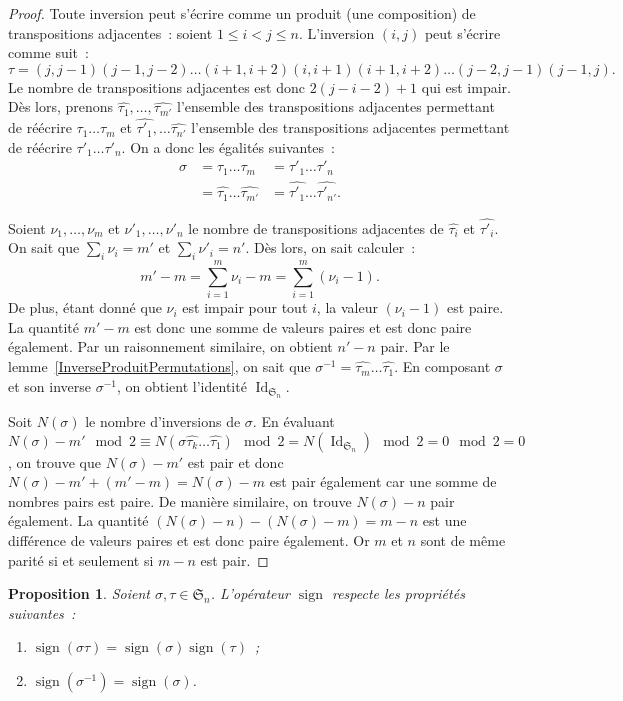 \documentclass{article}
\DeclareMathOperator{\Id}{Id}
\DeclareMathOperator{\sign}{sign}
\newcommand{\Perm}{\mathfrak{S}}
\newtheorem{prp}[thm]{Proposition}
\theoremstyle{definition}
\theoremstyle{remark}
\begin{document}
		\begin{proof} Toute inversion peut s'écrire comme un produit (une composition) de transpositions adjacentes~: soient $1 \leq i < j \leq n$. L'inversion $(i, j)$
		peut s'écrire comme suit~: \[\tau = (j, j-1)(j-1, j-2)\ldots(i+1, i+2)(i, i+1)(i+1, i+2)\ldots(j-2, j-1)(j-1, j).\]
		Le nombre de transpositions adjacentes est donc $2(j-i-2) + 1$ qui est impair. Dès lors, prenons $\hat{\tau_1}, \ldots, \hat{\tau_{m'}}$ l'ensemble des transpositions
		adjacentes permettant de réécrire $\tau_1\ldots\tau_m$ et $\hat{\tau'_1}, \ldots \hat{\tau_{n'}}$ l'ensemble des transpositions adjacentes permettant de réécrire
		$\tau'_1\ldots\tau'_n$. On a donc les égalités suivantes~:
		\[\begin{aligned}
			\sigma &= \tau_1\ldots\tau_m &= \tau'_1\ldots\tau'_n \\
			       &= \hat{\tau_1}\ldots\hat{\tau_{m'}} &= \hat{\tau'_1}\ldots\hat{\tau'_{n'}}.
		\end{aligned}\]

		Soient $\nu_1, \ldots, \nu_m$ et $\nu'_1, \ldots, \nu'_n$ le nombre de transpositions adjacentes de $\hat{\tau_i}$ et $\hat{\tau'_i}$. On sait que $\sum_i\nu_i = m'$
		et $\sum_i\nu'_i = n'$. Dès lors, on sait calculer~:
		\[m'-m = \sum_{i=1}^m\nu_i - m = \sum_{i=1}^m(\nu_i-1).\]
		De plus, étant donné que $\nu_i$ est impair pour tout $i$, la valeur $(\nu_i-1)$ est paire. La quantité $m'-m$ est donc une somme de valeurs paires et est donc paire également.
		Par un raisonnement similaire, on obtient $n'-n$ pair. Par le lemme~\ref{InverseProduitPermutations}, on sait que $\sigma^{-1} = \hat{\tau_m}\ldots\hat{\tau_1}$. En composant
		$\sigma$ et son inverse $\sigma^{-1}$, on obtient l'identité $\Id_{\Perm_n}$.

		Soit $N(\sigma)$ le nombre d'inversions de $\sigma$. En évaluant $N(\sigma) - m' \mod 2 \equiv N(\sigma\hat{\tau_k}\ldots\hat{\tau_1}) \mod 2 = N(\Id_{\Perm_n}) \mod 2 = 0 \mod 2 = 0$,
		on trouve que $N(\sigma) - m'$ est pair et donc $N(\sigma) - m' + (m' - m) = N(\sigma) - m$ est pair également car une somme de nombres pairs est paire.
		De manière similaire, on trouve $N(\sigma) - n$ pair également. La quantité $\left(N(\sigma) - n\right) - \left(N(\sigma) - m\right) = m - n$ est une différence de valeurs
		paires et est donc paire également. Or $m$ et $n$ sont de même parité si et seulement si $m - n$ est pair. \end{proof}

		\begin{prp}\label{PropsSign} Soient $\sigma, \tau \in \Perm_n$. L'opérateur $\sign$ respecte les propriétés suivantes~:

		\begin{enumerate}
			\item $\sign(\sigma\tau) = \sign(\sigma)\sign(\tau)$~;
			\item $\sign(\sigma^{-1}) = \sign(\sigma)$.
		\end{enumerate}
		\end{prp}
\end{document}
